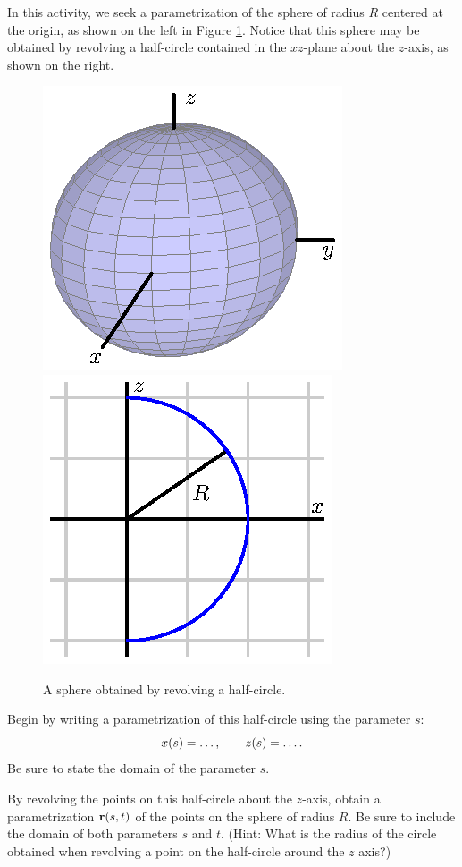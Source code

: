 \begin{activity} \label{A:11.6.10}  In this activity, we seek a
  parametrization of the sphere of radius $R$ centered at the origin, as
  shown on the left in Figure \ref{F:11.6.sphere}.  
  Notice that this sphere may be obtained by revolving a half-circle
  contained in the $xz$-plane about the $z$-axis, as shown on the right.

  \begin{figure}[ht]
    \begin{center}
      \includegraphics{figures/fig_11_6_sphere.eps}
      \hspace*{20pt}
      \includegraphics{figures/fig_11_6_sphere_half.eps}
    \end{center}
    \caption{A sphere obtained by revolving a half-circle.}
    \label{F:11.6.sphere}
  \end{figure}

  \ba
  \item Begin by writing a parametrization of this half-circle using
    the parameter $s$:
    $$
    x(s) = \ldots,\hspace*{20pt}
    z(s) = \ldots.
    $$
    Be sure to state the domain of the parameter $s$.
  \item By revolving the points on this half-circle about the
    $z$-axis, obtain a parametrization $\mathbf{r}(s,t)$ of the points on the
    sphere of radius $R$.  Be sure to include the domain of both
    parameters $s$ and $t$. (Hint: What is the radius of the circle obtained when revolving a point on the half-circle around the $z$ axis?)


\end{activity}
